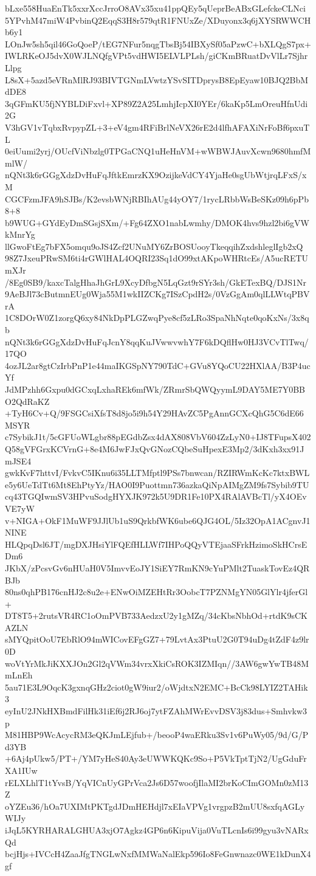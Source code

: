 bLxe558HuaEnTk5xxrXccJrroO8AVx35xu41ppQEy5qUeprBeABxGLefckeCLNci
5YPvhM47miW4PvbinQ2EqqS3H8r579qtR1FNUxZe/XDuyonx3q6jXYSRWWCHb6y1
LOnJw5sh5qil46GoQoeP/tEG7NFur5nqgTbsBj54IBXySf05aPzwC+bXLQgS7px+
IWLRKeOJ5dvX0WJLNQfgVPt5vdHWI5ELVLPLsh/giCKmBRuatDvVlLr7SjhrLlpg
L8sX+5azd5eVRnMlRJ93BIVTGNmLVwtzYSvSITDprysB8EpEyaw10BJQ2BbMdDE8
3qGFmKU5fjNYBLDiFxvl+XP89Z2A25LmhjIcpXI0YEr/6kaKp5LmOreuHfnUdi2G
V3hGV1vTqbxRvpypZL+3+eV4gm4RFiBrlNeVX26rE2d4lfhAFAXiNrFoBf6pxuTL
0eiUumi2yrj/OUcfViNbzlg0TPGaCNQ1uHeHnVM+wWBWJAuvXcwn9680hmfMmlW/
nQNt3k6rGGgXdzDvHuFqJftkEmrzKX9OzijkeVdCY4YjaHe0sgUbWtjrqLFxS/xM
CGCFzmJFA9hSJBs/K2evsbWNjRBIhAUg44yOY7/1rycLRbbWsBeSKz09h6pPb8+8
b9WUG+GYdEyDmSGsjSXm/+Fg64ZXO1nabLwmhy/DMOK4hvs9hzl2bi6gVWkMnrYg
llGwoFtEg7bFX5omqu9oJS4Zcf2UNuMY6ZrBOSUooyTkeqqihZxdshleglIgb2xQ
98Z7JxeuPRwSM6ti4rGWlHAL4OQRI23Sq1dO99xtAKpoWHRtcEs/A5ucRETUmXJr
/8Eg0SB9/kaxcTalgHhaJhGrL9XcyDfbgN5LqGzt9rSYr3sh/GkETexBQ/DJS1Nr
9AeBJl73cButmnEUg0Wja55M1wkIIZCKg7ISzCpdH2s/0VzGgAm0qlLLWtqPBVrA
1C8DOrW0Z1zorgQ6xy84NkDpPLGZwqPye8cf5zLRo3SpaNhNqte0qoKxNs/3x8qb
nQNt3k6rGGgXdzDvHuFqJcnY8qqKuJVwwvwhY7F6kDQflHw0HJ3VCvTlTwq/17QO
4ozJL2ar8gtCzIrbPnP1e44maIKGSpNY790TdC+GVu8YQoCU22HXlAA/B3P4ucYf
JdMPzhh6Gxpu0dGCxqLxhaREk6mfWk/ZRmrSbQWQyymL9DAY5ME7Y0BBO2QdRaKZ
+TyH6Cv+Q/9FSGCsiXfsT8d8jo5i9h54Y29HAvZC5PgAnnGCXcQhG5C6dE66MSYR
c7SybikJ1t/5cGFUoWLgbr88pEGdbZsx4dAX808VbV604ZzLyN0+IJ8TFupsX402
Q58gVFGrxKCVrnG+8e4M6JwFJxQvGNozCQbeSuHpexE3Mp2/3dKxh3xx91JmJSE4
gwkKvF7httvI/FvkvC5IKnu6i35LLTMfptl9PSs7bnwcan/RZIRWmKcKc7ktxBWL
e5y6UeTdTt6Mt8EhPtyYz/HAO0I9Puottmn736azkaQiNpAIMgZM9fs7Sybib9TU
cq43TGQIwmSV3HPvuSodgHYXJK972k5U9DR1Fe10PX4RAlAVBcTl/yX4OEvVE7yW
v+NIGA+OkF1MuWF9JJlUb1uS9QrkbfWK6ube6QJG4OL/5Iz32OpA1ACgnvJ1NINE
HLQpqDsl6JT/mgDXJHsiYlFQEfHLLWf7IHPoQQyVTEjaaSFrkHzimoSkHCrsEDm6
JKbX/zPcsvGv6nHUaH0V5ImvvEoJY1SiEY7RmKN9cYuPMlt2TuaskTovEz4QRBJb
80ns0qhPB176cnHJ2c8u2e+ENwOiMZEHtRr3OobcT7PZNMgYN05GlYlr4jferGl+
DT8T5+2rutsVR4RC1oOmPVB733AedzxU2y1gMZq/34cKbsNbhOd+rtdK9sCKAZLN
sMYQpitOoU7EbRlO94mWICovEFgGZ7+79LvtAx3PtuU2G0T94uDg4tZdF4z9lr0D
woVtYrMkJiKXXJOn2Gl2qVWm34vrxXkiCsROK3IZMIqn//3AW6gwYwTB48MmLnEh
5au71E3L9OqcK3gxnqGHz2ciot0gW9iur2/oWjdtxN2EMC+BcCk98LYIZ2TAHik3
eyInU2JNkHXBmdFilHk31iEf6j2RJ6oj7ytFZAhMWrEvvDSV3j83dus+Smhvkw3p
M81HBP9WcAcycRM3eQKJmLEjfub+/beooP4waERku3Sv1v6PuWy05/9d/G/Pd3YB
+6Aj4pUkw5/PT+/YM7yHeS40Ay3eUWWKQKc9So+P5VkTptTjN2/UgGduFrXA1IUw
rELXLhlT1tYvsB/YqVICnUyGPrVca2Js6D57woofjIlaMI2brKoCImGOMn0zM13Z
oYZEu36/hOa7UXIMtPKTgdJDmHEHdjl7xEIaVPVg1vrgpzB2mUU8sxfqAGLyWIJy
iJqL5KYRHARALGHUA3xjO7Agkz4GP6n6KipuVija0VuTLcnIs6i99gyu3vNARxQd
bcjHjs+IVCcH4ZaaJfgTNGLwNxfMMWaNalEkp596Io8FeGnwnazc0WE1kDunX4gf

